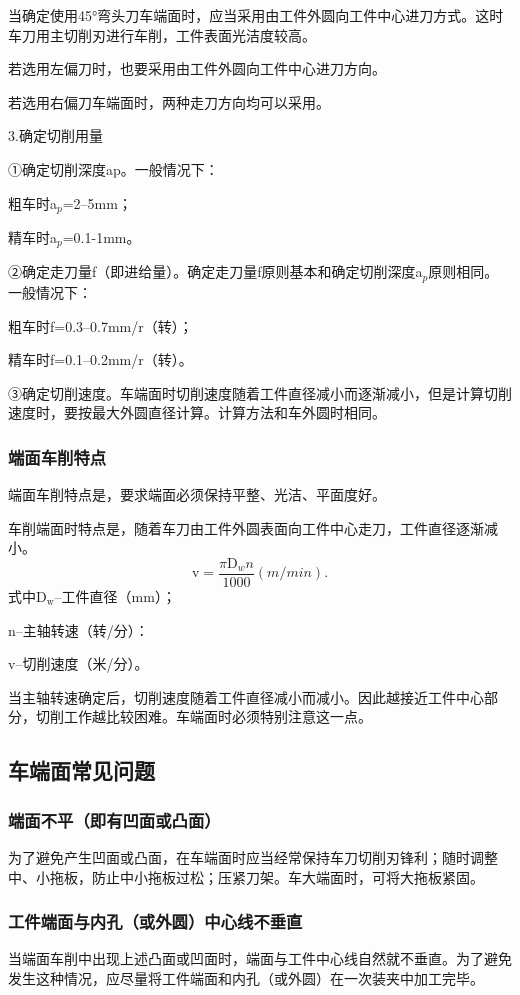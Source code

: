 \documentclass{ctexbook}
\begin{document}
当确定使用45°弯头刀车端面时，应当采用由工件外圆向工件中心进刀方式。这时车刀用主切削刃进行车削，工件表面光洁度较高。

若选用左偏刀时，也要采用由工件外圆向工件中心进刀方向。

若选用右偏刀车端面时，两种走刀方向均可以采用。

3.确定切削用量

①确定切削深度ap。一般情况下：

粗车时a$_p$=2--5mm；

精车时a$_p$=0.1-1mm。

②确定走刀量f（即进给量）。确定走刀量f原则基本和确定切削深度a$_p$原则相同。一般情况下：

粗车时f=0.3--0.7mm/r（转）；

精车时f=0.1--0.2mm/r（转）。

③确定切削速度。车端面时切削速度随着工件直径减小而逐渐减小，但是计算切削速度时，要按最大外圆直径计算。计算方法和车外圆时相同。
\subsubsection{端面车削特点}
端面车削特点是，要求端面必须保持平整、光洁、平面度好。

车削端面时特点是，随着车刀由工件外圆表面向工件中心走刀，工件直径逐渐减小。
\begin{equation*}
	\text{v}=\frac{\pi \text{D$_w$}n}{1000} (m/min).
\end{equation*}
式中D$_{\text{w}}$--工件直径（mm）；

n--主轴转速（转/分）：

v--切削速度（米/分）。

当主轴转速确定后，切削速度随着工件直径减小而减小。因此越接近工件中心部分，切削工作越比较困难。车端面时必须特别注意这一点。
\subsection{车端面常见问题}
\subsubsection{端面不平（即有凹面或凸面）}
为了避免产生凹面或凸面，在车端面时应当经常保持车刀切削刃锋利；随时调整中、小拖板，防止中小拖板过松；压紧刀架。车大端面时，可将大拖板紧固。
\subsubsection{工件端面与内孔（或外圆）中心线不垂直}
当端面车削中出现上述凸面或凹面时，端面与工件中心线自然就不垂直。为了避免发生这种情况，应尽量将工件端面和内孔（或外圆）在一次装夹中加工完毕。
\end{document}
